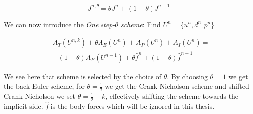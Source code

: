 \begin{equation}
J^{n, \theta} = \theta J^n + (1-\theta)J^{n-1}
\end{equation}

We can now introduce the \textit{One step-$\theta$ scheme}: 
Find $U^n = \{u^n , d^n, p^n \}$

\begin{align}
& A_T(U^{n,k}) + \theta A_E(U^{n}) + A_P(U^{n}) + A_I(U^{n}) = \\
& - (1-\theta) A_E(U^{n-1}) + \theta \hat{f}^n + (1-\theta) \hat{f}^{n-1}  
\end{align}

We see here that scheme is selected by the choice of $\theta $. By choosing $ \theta = 1$ we get the back Euler scheme, for $ \theta = \frac{1}{2}$ we get the Crank-Nicholson scheme and shifted Crank-Nicholson we set $ \theta = \frac{1}{2} + k$, effectively shifting the scheme towards the implicit side. $\hat{f}$ is the body forces which will be ignored in this thesis. 






